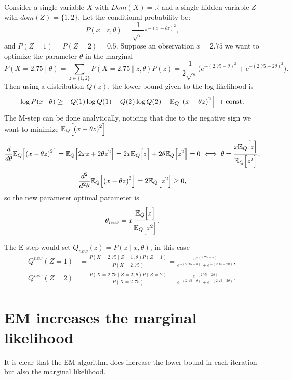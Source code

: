 \begin{exampleth}
  Consider a single variable \(X\) with \(Dom(X) = \mathbb{R}\) and a single hidden variable \(Z\) with \(dom(Z) = \{1,2\}\). Let the conditional probability be:
  \[
    P(x \mid z, \theta) = \frac{1}{\sqrt{\pi}}e^{{-(x - \theta z)}^{2}},
  \]
  and \(P(Z = 1) = P(Z = 2) = 0.5\). Suppose an observation \(x = 2.75\) we want to optimize the parameter \(\theta\) in the marginal
  \[
    P(X = 2.75 \mid \theta) = \sum_{z \in \{1,2\}} P(X = 2.75 \mid z, \theta) P(z) = \frac{1}{2\sqrt{\pi}}\big( e^{{-(2.75 - \theta)}^{2}} + e^{{-(2.75 - 2\theta)}^{2}} \big).
  \]
  Then using a distribution \(Q(z)\), the lower bound given to the log likelihood is
  \[
    \log{P(x \mid \theta)} \geq -Q(1)\log{Q(1)} - Q(2)\log{Q(2)} - \mathbb{E}_{Q}\Big[{(x - \theta z)}^{2}\Big]\ + \text{const.}
  \]
  The M-step can be done analytically, noticing that due to the negative sign we want to minimize \(\mathbb{E}_{Q}\Big[{(x - \theta z)}^{2}\Big]\)
  \[
    \frac{d}{d\theta}\mathbb{E}_{Q}\Big[{(x - \theta z)}^{2}\Big] = \mathbb{E}_{Q}\Big[ 2 x z + 2\theta z^{2} \Big] = 2x\mathbb{E}_{Q}\Big[z\Big] + 2\theta \mathbb{E}_{Q}\Big[z^{2}\Big] = 0 \iff \theta = \frac{x\mathbb{E}_{Q}\Big[z\Big]}{\mathbb{E}_{Q}\Big[z^{2}\Big]},
  \]
  \[
    \frac{d^{2}}{d^{2}\theta}\mathbb{E}_{Q}\Big[{(x - \theta z)}^{2}\Big] = 2\mathbb{E}_{Q}\Big[z^{2}\Big] \geq 0,
  \]
  so the new parameter optimal parameter is
  \[
    \theta_{new} = x \frac{\mathbb{E}_{Q}\Big[z\Big]}{\mathbb{E}_{Q}\Big[z^{2}\Big]}.
  \]

  The E-step would set \(Q_{new}(z) = P(z \mid x , \theta)\), in this case
  \[
    \begin{aligned}
      Q^{new}(Z = 1) &= \frac{P(X = 2.75 \mid Z = 1, \theta)P(Z = 1)}{P(X = 2.75)} = \frac{e^{-(2.75-\theta)}}{ e^{-(2.75-\theta)} + e^{-(2.75-2\theta)}  },\\
      Q^{new}(Z = 2) &= \frac{P(X = 2.75 \mid Z = 2, \theta)P(Z = 2)}{P(X = 2.75)} = \frac{e^{-(2.75-2\theta)}}{ e^{-(2.75-\theta)} + e^{-(2.75-2\theta)}  }.
    \end{aligned}
  \]
\end{exampleth}



\section{EM increases the marginal likelihood}

It is clear that the EM algorithm does increase the lower bound in each iteration but also the marginal likelihood.

